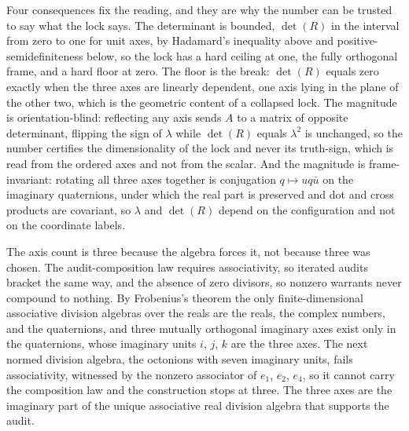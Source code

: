 \documentclass[10pt,twocolumn]{article}
\begin{document}
Four consequences fix the reading, and they are why the number can be
trusted to say what the lock says. The determinant is bounded,
\(\det(R)\) in the interval from zero to one for unit axes, by
Hadamard's inequality above and positive-semidefiniteness below, so the
lock has a hard ceiling at one, the fully orthogonal frame, and a hard
floor at zero. The floor is the break: \(\det(R)\) equals zero exactly
when the three axes are linearly dependent, one axis lying in the plane
of the other two, which is the geometric content of a collapsed lock.
The magnitude is orientation-blind: reflecting any axis sends \(A\) to a
matrix of opposite determinant, flipping the sign of \(\lambda\) while
\(\det(R)\) equals \(\lambda^2\) is unchanged, so the number certifies
the dimensionality of the lock and never its truth-sign, which is read
from the ordered axes and not from the scalar. And the magnitude is
frame-invariant: rotating all three axes together is conjugation
\(q\mapsto uq\bar u\) on the imaginary quaternions, under which the real
part is preserved and dot and cross products are covariant, so
\(\lambda\) and \(\det(R)\) depend on the configuration and not on the
coordinate labels.

The axis count is three because the algebra forces it, not because three
was chosen. The audit-composition law requires associativity, so
iterated audits bracket the same way, and the absence of zero divisors,
so nonzero warrants never compound to nothing. By Frobenius's theorem
the only finite-dimensional associative division algebras over the reals
are the reals, the complex numbers, and the quaternions, and three
mutually orthogonal imaginary axes exist only in the quaternions, whose
imaginary units \(i\), \(j\), \(k\) are the three axes. The next normed
division algebra, the octonions with seven imaginary units, fails
associativity, witnessed by the nonzero associator of \(e_1\), \(e_2\),
\(e_4\), so it cannot carry the composition law and the construction
stops at three. The three axes are the imaginary part of the unique
associative real division algebra that supports the audit.
\end{document}
